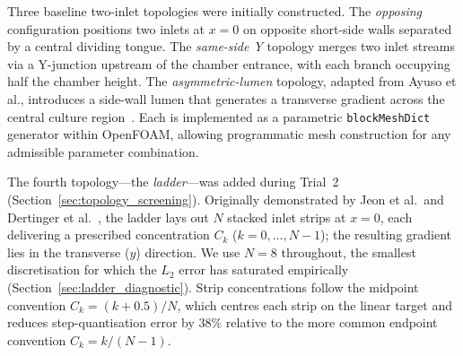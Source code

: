 \documentclass[12pt]{article}
\begin{document}
Three baseline two-inlet topologies were initially constructed. The \emph{opposing} configuration positions two inlets at $x = 0$ on opposite short-side walls separated by a central dividing tongue. The \emph{same-side Y} topology merges two inlet streams via a Y-junction upstream of the chamber entrance, with each branch occupying half the chamber height. The \emph{asymmetric-lumen} topology, adapted from Ayuso et al., introduces a side-wall lumen that generates a transverse gradient across the central culture region~\cite{ayuso2021microfluidic}. Each is implemented as a parametric \texttt{blockMeshDict} generator within OpenFOAM, allowing programmatic mesh construction for any admissible parameter combination.

The fourth topology---the \emph{ladder}---was added during Trial~2 (Section~\ref{sec:topology_screening}). Originally demonstrated by Jeon et al.\ and Dertinger et al.~\cite{jeon2000generation,dertinger2001generation}, the ladder lays out $N$ stacked inlet strips at $x = 0$, each delivering a prescribed concentration $C_k$ ($k = 0, \dots, N-1$); the resulting gradient lies in the transverse ($y$) direction. We use $N = 8$ throughout, the smallest discretisation for which the $L_2$ error has saturated empirically (Section~\ref{sec:ladder_diagnostic}). Strip concentrations follow the midpoint convention $C_k = (k + 0.5)/N$, which centres each strip on the linear target and reduces step-quantisation error by $38\%$ relative to the more common endpoint convention $C_k = k/(N-1)$.
\end{document}
